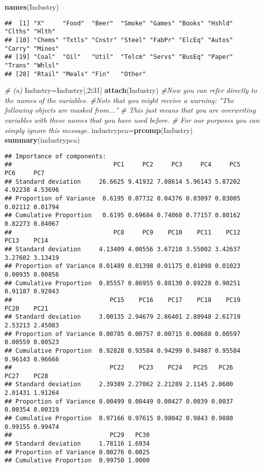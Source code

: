 \documentclass[
]{article}
\newenvironment{Shaded}{\begin{snugshade}}{\end{snugshade}}
\newcommand{\CommentTok}[1]{\textcolor[rgb]{0.56,0.35,0.01}{\textit{#1}}}
\newcommand{\DecValTok}[1]{\textcolor[rgb]{0.00,0.00,0.81}{#1}}
\newcommand{\FunctionTok}[1]{\textcolor[rgb]{0.13,0.29,0.53}{\textbf{#1}}}
\newcommand{\NormalTok}[1]{#1}
\newcommand{\OtherTok}[1]{\textcolor[rgb]{0.56,0.35,0.01}{#1}}
\newcommand{\SpecialCharTok}[1]{\textcolor[rgb]{0.81,0.36,0.00}{\textbf{#1}}}
\begin{document}
\begin{Shaded}
\begin{Highlighting}[]
\FunctionTok{names}\NormalTok{(Industry)}
\end{Highlighting}
\end{Shaded}

\begin{verbatim}
##  [1] "X"     "Food"  "Beer"  "Smoke" "Games" "Books" "Hshld" "Clths" "Hlth" 
## [10] "Chems" "Txtls" "Cnstr" "Steel" "FabPr" "ElcEq" "Autos" "Carry" "Mines"
## [19] "Coal"  "Oil"   "Util"  "Telcm" "Servs" "BusEq" "Paper" "Trans" "Whlsl"
## [28] "Rtail" "Meals" "Fin"   "Other"
\end{verbatim}

\begin{Shaded}
\begin{Highlighting}[]
\CommentTok{\# (a)}
\NormalTok{Industry}\OtherTok{=}\NormalTok{Industry[,}\DecValTok{2}\SpecialCharTok{:}\DecValTok{31}\NormalTok{]}
\FunctionTok{attach}\NormalTok{(Industry) }\CommentTok{\#Now you can refer directly to the names of the variables.}
\CommentTok{\#Note that you might receive a warning: "The following objects are masked from..."}
\CommentTok{\# This just means that you are overwriting variables with these names that you have used before.}
\CommentTok{\# For our purposes you can simply ignore this message.}
\NormalTok{industrypca}\OtherTok{=}\FunctionTok{prcomp}\NormalTok{(Industry)}
\FunctionTok{summary}\NormalTok{(industrypca)}
\end{Highlighting}
\end{Shaded}

\begin{verbatim}
## Importance of components:
##                            PC1     PC2     PC3     PC4     PC5     PC6     PC7
## Standard deviation     26.6625 9.41932 7.08614 5.96143 5.87202 4.92238 4.53696
## Proportion of Variance  0.6195 0.07732 0.04376 0.03097 0.03005 0.02112 0.01794
## Cumulative Proportion   0.6195 0.69684 0.74060 0.77157 0.80162 0.82273 0.84067
##                            PC8     PC9    PC10    PC11    PC12    PC13    PC14
## Standard deviation     4.13409 4.00556 3.67210 3.55002 3.42637 3.27602 3.13419
## Proportion of Variance 0.01489 0.01398 0.01175 0.01098 0.01023 0.00935 0.00856
## Cumulative Proportion  0.85557 0.86955 0.88130 0.89228 0.90251 0.91187 0.92043
##                           PC15    PC16    PC17    PC18    PC19    PC20    PC21
## Standard deviation     3.00135 2.94679 2.86401 2.80948 2.61719 2.53213 2.45083
## Proportion of Variance 0.00785 0.00757 0.00715 0.00688 0.00597 0.00559 0.00523
## Cumulative Proportion  0.92828 0.93584 0.94299 0.94987 0.95584 0.96143 0.96666
##                           PC22    PC23    PC24   PC25   PC26    PC27    PC28
## Standard deviation     2.39389 2.27062 2.21289 2.1145 2.0600 2.01431 1.91264
## Proportion of Variance 0.00499 0.00449 0.00427 0.0039 0.0037 0.00354 0.00319
## Cumulative Proportion  0.97166 0.97615 0.98042 0.9843 0.9880 0.99155 0.99474
##                           PC29   PC30
## Standard deviation     1.78116 1.6934
## Proportion of Variance 0.00276 0.0025
## Cumulative Proportion  0.99750 1.0000
\end{verbatim}
\end{document}
